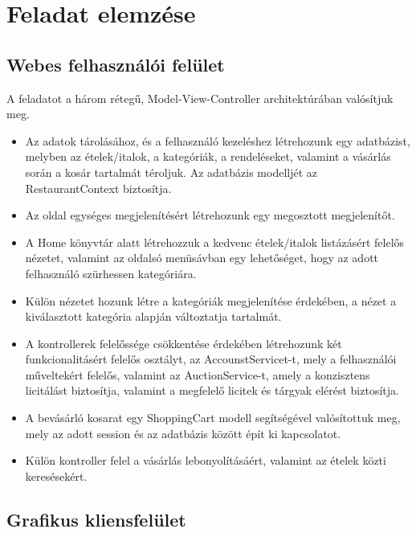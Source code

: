 \documentclass[12pt,a4paper]{article}
\begin{document}
\section{Feladat elemzése}

\subsection{Webes felhasználói felület}

A feladatot a három rétegű, Model-View-Controller architektúrában valósítjuk meg.
\begin{itemize}
\item Az adatok tárolásához, és a felhasználó kezeléshez létrehozunk egy adatbázist, melyben az ételek/italok, a kategóriák,  a rendeléseket, valamint a vásárlás során a kosár tartalmát téroljuk. Az adatbázis modelljét az RestaurantContext biztosítja.
\item Az oldal egységes megjelenítésért létrehozunk egy megosztott megjelenítőt.
\item A Home könyvtár alatt létrehozzuk a kedvenc ételek/italok listázásért felelős nézetet, valamint az oldalsó menüsávban egy lehetőséget, hogy az adott felhasználó szürhessen kategóriára.
\item Külön nézetet hozunk létre a kategóriák megjelenítése érdekében, a nézet a kiválasztott kategória alapján változtatja tartalmát.
\item A kontrollerek felelőssége csökkentése érdekében létrehozunk két funkcionalitásért felelős osztályt, az AccounstServicet-t, mely a felhasználói műveltekért felelős, valamint az AuctionService-t, amely a konzisztens licitálást biztosítja, valamint a megfelelő licitek és tárgyak elérést biztosítja.
\item A bevásárló kosarat egy ShoppingCart modell segítségével valósítottuk meg, mely az adott session és az adatbázis között épít ki kapcsolatot.
\item Külön kontroller felel a vásárlás lebonyolításáért, valamint az ételek közti keresésekért.
\end{itemize}


\subsection{Grafikus kliensfelület}
\end{document}
